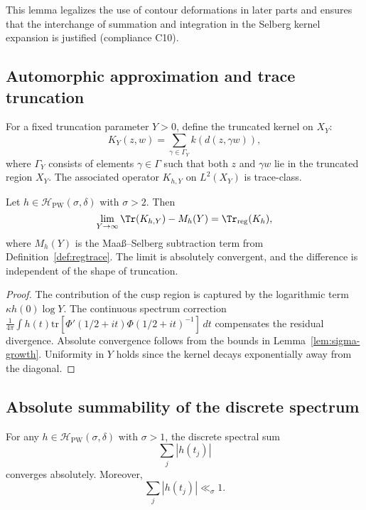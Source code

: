 \begin{remark}
This lemma legalizes the use of contour deformations in later parts and ensures that the interchange of summation and integration in the Selberg kernel expansion is justified (compliance C10).
\end{remark}

\subsection{Automorphic approximation and trace truncation}
\label{subsec:ch4-part2-automorphic-approx}
\relax

For a fixed truncation parameter $Y>0$, define the truncated kernel on $X_Y$:
\[
K_Y(z,w) = \sum_{\gamma\in\Gamma_Y} k(d(z,\gamma w)),
\]
where $\Gamma_Y$ consists of elements $\gamma\in\Gamma$ such that both $z$ and $\gamma w$ lie in the truncated region $X_Y$.  
The associated operator $K_{h,Y}$ on $L^2(X_Y)$ is trace-class.

\begin{lemma}
\label{lem:trace-conv}
Let $h\in\mathcal{H}_{\mathrm{PW}}(\sigma,\delta)$ with $\sigma>2$. Then
\[
\lim_{Y\to\infty}\Tr(K_{h,Y}) - M_h(Y)
= \Tr_{\mathrm{reg}}(K_h),
\]
where $M_h(Y)$ is the Maaß–Selberg subtraction term from Definition~\ref{def:regtrace}.  
The limit is absolutely convergent, and the difference is independent of the shape of truncation.
\end{lemma}

\begin{proof}\relax
The contribution of the cusp region is captured by the logarithmic term $\kappa h(0)\log Y$.  
The continuous spectrum correction $\frac{1}{4\pi}\int h(t)\mathrm{tr}[\Phi'(1/2+it)\Phi(1/2+it)^{-1}]\,dt$ compensates the residual divergence.  
Absolute convergence follows from the bounds in Lemma~\ref{lem:sigma-growth}.  
Uniformity in $Y$ holds since the kernel decays exponentially away from the diagonal.
\end{proof}

\subsection{Absolute summability of the discrete spectrum}
\label{subsec:ch4-part2-summability}
\relax

\begin{theorem}
\label{thm:abs-sum}
For any $h\in\mathcal{H}_{\mathrm{PW}}(\sigma,\delta)$ with $\sigma>1$, the discrete spectral sum
\[
\sum_j |h(t_j)|
\]
converges absolutely. Moreover,
\[
\sum_j |h(t_j)| \ll_{\sigma} 1.
\]
\end{theorem}

